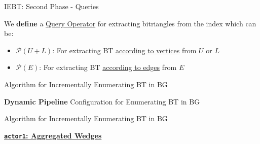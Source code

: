 \begin{frame}[fragile]{IEBT: Second Phase - Queries}
  \begin{center}
    \large We \textbf{define} a \underline{\color{red}Query Operator} for extracting bitriangles from the index which can be:
  \end{center}  
  \vspace{2em}
  \begin{itemize}
    \setlength\itemsep{2em}
    \item \textbf{$\mathcal{P}(U+L)$}: For extracting BT \underline{\color{blue}according to vertices} from $U$ or $L$
    \item \textbf{$\mathcal{P}(E)$}: For extracting BT \underline{\color{blue}according to edges} from $E$
  \end{itemize}  
\end{frame}

\begin{frame}[fragile]{Algorithm for Incrementally Enumerating BT in BG}
  \begin{center}
    \textbf{Dynamic Pipeline} Configuration for Enumerating BT in BG
  \end{center}    
  \begin{figure}
    \centering  
  \end{figure}
  \begin{figure}
    \centering  
  \end{figure}
\end{frame}

\begin{frame}[fragile]{Algorithm for Incrementally Enumerating BT in BG}
  \begin{center}
    \underline{\textbf{\texttt{actor1}: Aggregated Wedges}}
  \end{center}
\end{frame}

